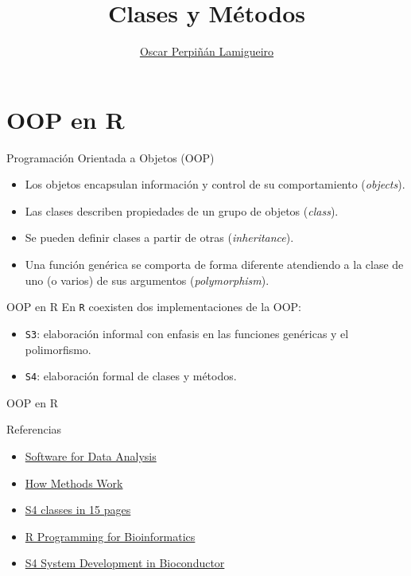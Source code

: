 \documentclass[xcolor={usenames,svgnames,dvipsnames}]{beamer}
\author{\href{https://oscarperpinan.github.io}{Oscar Perpiñán Lamigueiro}}
\date{}
\title{Clases y Métodos}
\institute[UPM]{Universidad Politécnica de Madrid}
\begin{document}
\maketitle

\section{OOP en R}
\label{sec:orgfa03290}

\begin{frame}[label={sec:org878b488}]{Programación Orientada a Objetos (OOP)}
\begin{itemize}
\item Los objetos encapsulan información y control de su comportamiento (\emph{objects}).
\item Las clases describen propiedades de un grupo de objetos (\emph{class}).
\item Se pueden definir clases a partir de otras (\emph{inheritance}).
\item Una función genérica se comporta de forma diferente atendiendo a la
clase de uno (o varios) de sus argumentos (\emph{polymorphism}).
\end{itemize}
\end{frame}
\begin{frame}[label={sec:org0183b4c},fragile]{OOP en R}
 En \texttt{R} coexisten dos implementaciones de la OOP:
\begin{itemize}
\item \texttt{S3}: elaboración informal con enfasis en las funciones genéricas y el polimorfismo.
\item \texttt{S4}: elaboración formal de clases y métodos.
\end{itemize}
\end{frame}
\begin{frame}[label={sec:org28857f7}]{OOP en R}
\begin{block}{Referencias}
\begin{center}
\begin{itemize}
\item \href{http://www.springer.com/gb/book/9780387759357}{Software for Data Analysis}
\item \href{http://developer.r-project.org/howMethodsWork.pdf}{How Methods Work}
\item \href{http://www.stat.auckland.ac.nz/S-Workshop/Gentleman/S4Objects.pdf}{S4 classes in 15 pages}
\item \href{http://bioconductor.org/help/publications/books/r-programming-for-bioinformatics/}{R Programming for Bioinformatics }
\item \href{http://bioconductor.org/help/course-materials/2010/AdvancedR/S4InBioconductor.pdf}{S4 System Development in Bioconductor}
\end{itemize}
\end{center}
\end{block}
\end{frame}
\end{document}
